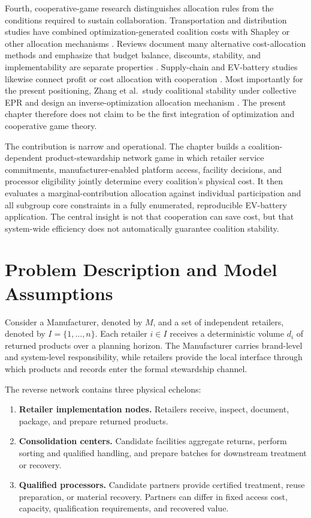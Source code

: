Fourth, cooperative-game research distinguishes allocation rules from the conditions required to sustain collaboration. Transportation and distribution studies have combined optimization-generated coalition costs with Shapley or other allocation mechanisms \cite{OzenerErgun2008,lozano2013cooperative,wang2023collaborative}. Reviews document many alternative cost-allocation methods and emphasize that budget balance, discounts, stability, and implementability are separate properties \cite{GuajardoRonnqvist2016,luo2022core}. Supply-chain and EV-battery studies likewise connect profit or cost allocation with cooperation \cite{meng2023profit,Xiao2024}. Most importantly for the present positioning, Zhang et al.\ study coalitional stability under collective EPR and design an inverse-optimization allocation mechanism \cite{ZhangCollectiveEPR2026}. The present chapter therefore does not claim to be the first integration of optimization and cooperative game theory.

The contribution is narrow and operational. The chapter builds a coalition-dependent product-stewardship network game in which retailer service commitments, manufacturer-enabled platform access, facility decisions, and processor eligibility jointly determine every coalition's physical cost. It then evaluates a marginal-contribution allocation against individual participation and all subgroup core constraints in a fully enumerated, reproducible EV-battery application. The central insight is not that cooperation can save cost, but that system-wide efficiency does not automatically guarantee coalition stability.

\section{Problem Description and Model Assumptions}
\label{sec:problem_desc}

Consider a Manufacturer, denoted by $M$, and a set of independent retailers, denoted by $I=\{1,\ldots,n\}$. Each retailer $i\in I$ receives a deterministic volume $d_i$ of returned products over a planning horizon. The Manufacturer carries brand-level and system-level responsibility, while retailers provide the local interface through which products and records enter the formal stewardship channel.

The reverse network contains three physical echelons:
\begin{enumerate}
    \item \textbf{Retailer implementation nodes.} Retailers receive, inspect, document, package, and prepare returned products.
    \item \textbf{Consolidation centers.} Candidate facilities aggregate returns, perform sorting and qualified handling, and prepare batches for downstream treatment or recovery.
    \item \textbf{Qualified processors.} Candidate partners provide certified treatment, reuse preparation, or material recovery. Partners can differ in fixed access cost, capacity, qualification requirements, and recovered value.
\end{enumerate}

